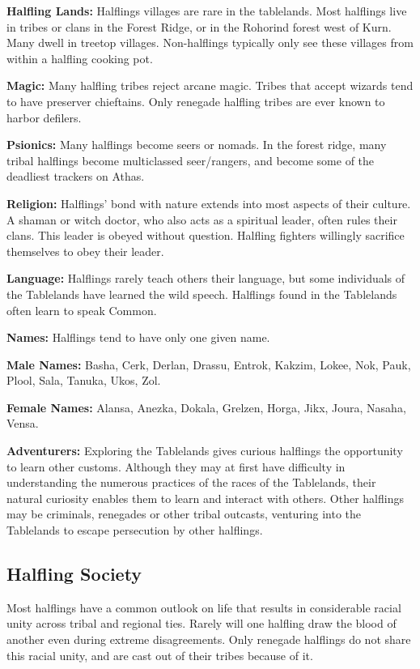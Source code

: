 \textbf{Halfling Lands:} Halflings villages are rare in the tablelands. Most halflings live in tribes or clans in the Forest Ridge, or in the Rohorind forest west of Kurn. Many dwell in treetop villages. Non-halflings typically only see these villages from within a halfling cooking pot.

\textbf{Magic:} Many halfling tribes reject arcane magic. Tribes that accept wizards tend to have preserver chieftains. Only renegade halfling tribes are ever known to harbor defilers.

\textbf{Psionics:} Many halflings become seers or nomads. In the forest ridge, many tribal halflings become multiclassed seer/rangers, and become some of the deadliest trackers on Athas.

\textbf{Religion:} Halflings' bond with nature extends into most aspects of their culture. A shaman or witch doctor, who also acts as a spiritual leader, often rules their clans. This leader is obeyed without question. Halfling fighters willingly sacrifice themselves to obey their leader.

\textbf{Language:} Halflings rarely teach others their language, but some individuals of the Tablelands have learned the wild speech. Halflings found in the Tablelands often learn to speak Common.

\textbf{Names:} Halflings tend to have only one given name.

\textbf{Male Names:} Basha, Cerk, Derlan, Drassu, Entrok, Kakzim, Lokee, Nok, Pauk, Plool, Sala, Tanuka, Ukos, Zol.

\textbf{Female Names:} Alansa, Anezka, Dokala, Grelzen, Horga, Jikx, Joura, Nasaha, Vensa.

\textbf{Adventurers:} Exploring the Tablelands gives curious halflings the opportunity to learn other customs. Although they may at first have difficulty in understanding the numerous practices of the races of the Tablelands, their natural curiosity enables them to learn and interact with others. Other halflings may be criminals, renegades or other tribal outcasts, venturing into the Tablelands to escape persecution by other halflings.

\subsection{Halfling Society}
Most halflings have a common outlook on life that results in considerable racial unity across tribal and regional ties. Rarely will one halfling draw the blood of another even during extreme disagreements. Only renegade halflings do not share this racial unity, and are cast out of their tribes because of it.

